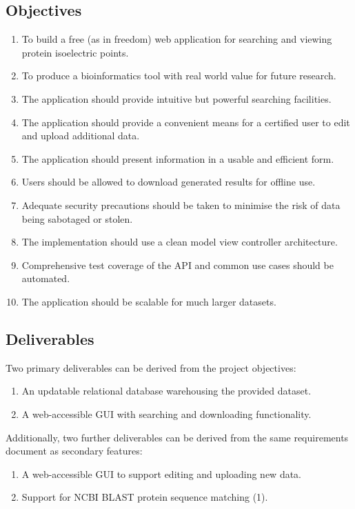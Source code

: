 \documentclass[12pt,a4paper]{article}
\begin{document}
\subsection{Objectives}

\begin{enumerate}
\item To build a free (as in freedom) web application for searching and viewing
  protein isoelectric points.
\item To produce a bioinformatics tool with real world value for future
  research.
\item The application should provide intuitive but powerful searching
  facilities.
\item The application should provide a convenient means for a certified user to
  edit and upload additional data.
\item The application should present information in a usable and efficient form.
\item Users should be allowed to download generated results for offline use.
\item Adequate security precautions should be taken to minimise the risk of data
  being sabotaged or stolen.
\item The implementation should use a clean model view controller architecture.
\item Comprehensive test coverage of the API and common use cases should be
  automated.
\item The application should be scalable for much larger datasets.
\end{enumerate}

\subsection{Deliverables}
Two primary deliverables can be derived from the project objectives:

\begin{enumerate}
\item An updatable relational database warehousing the provided dataset.
\item A web-accessible GUI with searching and downloading functionality.
\end{enumerate}

Additionally, two further deliverables can be derived from the same requirements
document as secondary features:

\begin{enumerate}
\item A web-accessible GUI to support editing and uploading new data.
\item Support for NCBI BLAST protein sequence matching (1).
\end{enumerate}
\end{document}
